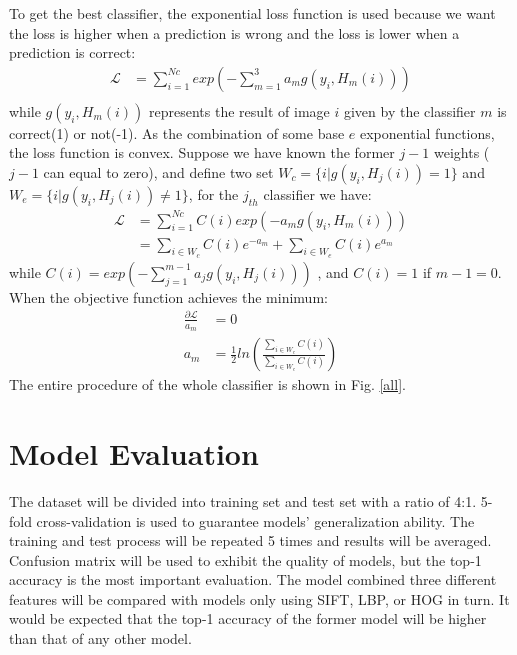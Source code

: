 \documentclass[conference]{IEEEtran}
\begin{document}
To get the best classifier, the exponential loss function is used because we want the loss is higher when a prediction is wrong and the loss is lower when a prediction is correct:
\begin{align}
	\mathcal{L} & = \sum\limits_{i=1}^{Nc}exp(-\sum\limits_{m=1}^{3}a_mg(y_i,H_m(i)))\\
\end{align}
while $g(y_i,H_m(i))$ represents the result of image $i$ given by the classifier $m$ is correct(1) or not(-1). As the combination of some base $e$ exponential functions, the loss function is convex. Suppose we have known the former $j-1$ weights ($j-1$ can equal to zero), and define two set $W_c = \{i|g(y_i,H_j(i)) = 1\}$ and $W_e = \{i|g(y_i,H_j(i)) \not= 1\}$, for the $j_{th}$ classifier we have\cite{ada}:
\begin{align}
 	\mathcal{L} & = \sum\limits_{i=1}^{Nc}C(i)exp(-a_mg(y_i,H_m(i)))\\
 	& = \sum\limits_{i \in W_c}C(i)e^{-a_m} +\sum\limits_{i\in W_e}C(i)e^{a_m}
 \end{align}
 while $C(i) = exp(-\sum\limits_{j=1}^{m-1}a_jg(y_i,H_j(i)))$ , and $C(i) = 1$ if $m-1 = 0$.
 When the objective function achieves the minimum:
 \begin{align}
 	\frac{\partial{\mathcal{L}}}{a_m} & = 0\\
 	a_m & = \frac{1}{2}ln(\frac{\sum\limits_{i\in W_c}C(i)}{\sum\limits_{i\in W_e}C(i)})
 \end{align}
The entire procedure of the whole classifier is
shown in Fig. \ref{all}. 

\section{Model Evaluation} The dataset will be divided into training set and test set with a ratio of 4:1. 5-fold cross-validation is used to guarantee models' generalization ability. The training and test process will be repeated 5 times and results will be averaged. Confusion matrix will be used to exhibit the quality of models, but the top-1 accuracy is the most important evaluation. The model combined three different features will be compared with models only using SIFT, LBP, or HOG in turn. It would be expected that the top-1 accuracy of the former model will be higher than that of any other model. 
\end{document}
